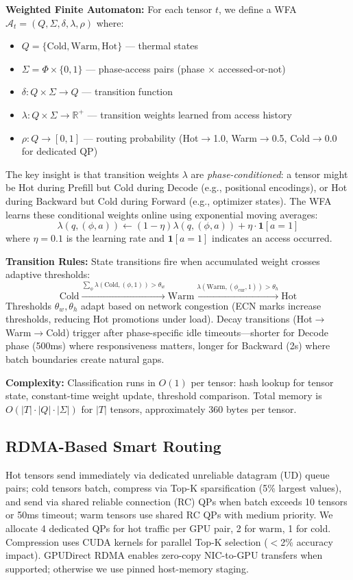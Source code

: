 \documentclass[10pt,letterpaper]{article}
\begin{document}
\textbf{Weighted Finite Automaton:} For each tensor $t$, we define a WFA $\mathcal{A}_t = (Q, \Sigma, \delta, \lambda, \rho)$ where:
\begin{itemize}[nosep]
\item $Q = \{\text{Cold}, \text{Warm}, \text{Hot}\}$ --- thermal states
\item $\Sigma = \Phi \times \{0,1\}$ --- phase-access pairs (phase $\times$ accessed-or-not)
\item $\delta: Q \times \Sigma \rightarrow Q$ --- transition function
\item $\lambda: Q \times \Sigma \rightarrow \mathbb{R}^+$ --- transition weights learned from access history
\item $\rho: Q \rightarrow [0,1]$ --- routing probability (Hot$\rightarrow$1.0, Warm$\rightarrow$0.5, Cold$\rightarrow$0.0 for dedicated QP)
\end{itemize}

The key insight is that transition weights $\lambda$ are \textit{phase-conditioned}: a tensor might be Hot during Prefill but Cold during Decode (e.g., positional encodings), or Hot during Backward but Cold during Forward (e.g., optimizer states). The WFA learns these conditional weights online using exponential moving averages:
\[
\lambda(q, (\phi, a)) \leftarrow (1-\eta)\lambda(q, (\phi, a)) + \eta \cdot \mathbf{1}[a = 1]
\]
where $\eta = 0.1$ is the learning rate and $\mathbf{1}[a=1]$ indicates an access occurred.

\textbf{Transition Rules:} State transitions fire when accumulated weight crosses adaptive thresholds:
\[
\text{Cold} \xrightarrow{\sum_\phi \lambda(\text{Cold}, (\phi, 1)) > \theta_w} \text{Warm} \xrightarrow{\lambda(\text{Warm}, (\phi_{\text{cur}}, 1)) > \theta_h} \text{Hot}
\]
Thresholds $\theta_w, \theta_h$ adapt based on network congestion (ECN marks increase thresholds, reducing Hot promotions under load). Decay transitions (Hot$\rightarrow$Warm$\rightarrow$Cold) trigger after phase-specific idle timeouts---shorter for Decode phase (500ms) where responsiveness matters, longer for Backward (2s) where batch boundaries create natural gaps.

\textbf{Complexity:} Classification runs in $O(1)$ per tensor: hash lookup for tensor state, constant-time weight update, threshold comparison. Total memory is $O(|T| \cdot |Q| \cdot |\Sigma|)$ for $|T|$ tensors, approximately 360 bytes per tensor.

\subsection{RDMA-Based Smart Routing}
Hot tensors send immediately via dedicated unreliable datagram (UD) queue pairs; cold tensors batch, compress via Top-K sparsification (5\% largest values), and send via shared reliable connection (RC) QPs when batch exceeds 10 tensors or 50ms timeout; warm tensors use shared RC QPs with medium priority. We allocate 4 dedicated QPs for hot traffic per GPU pair, 2 for warm, 1 for cold. Compression uses CUDA kernels for parallel Top-K selection ($<$2\% accuracy impact). GPUDirect RDMA enables zero-copy NIC-to-GPU transfers when supported; otherwise we use pinned host-memory staging.
\end{document}
